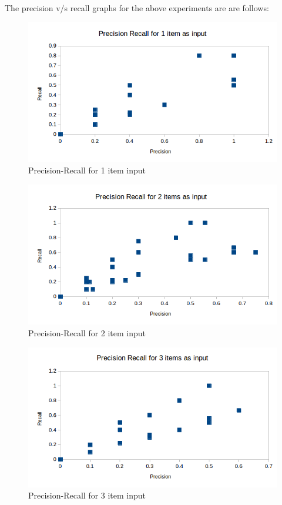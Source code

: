 The precision v/s recall graphs for the above experiments are are follows:

\begin{figure}[htb]
\centering
\includegraphics[scale=0.6]{g11}
\caption{Precision-Recall for 1 item input}
\label{fig:g1}
\end{figure}

\begin{figure}[htb]
\centering
\includegraphics[scale=0.6]{g22}
\caption{Precision-Recall for 2 item input}
\label{fig:g2}
\end{figure}

\begin{figure}[htb]
\centering
\includegraphics[scale=0.6]{g33}
\caption{Precision-Recall for 3 item input}
\label{fig:g3}
\end{figure}

